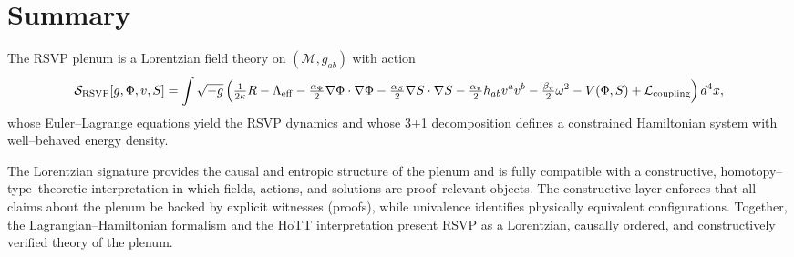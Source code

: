 \section{Summary}

The RSVP plenum is a Lorentzian field theory on $(\mathcal{M},g_{ab})$ with action
\[
\mathcal{S}_{\mathrm{RSVP}}[g,\Phi,v,S]
  = \int \sqrt{-g}\,
    \Bigl(
      \tfrac{1}{2\kappa}R
      -\Lambda_{\mathrm{eff}}
      -\tfrac{\alpha_\Phi}{2}\nabla\Phi\cdot\nabla\Phi
      -\tfrac{\alpha_S}{2}\nabla S\cdot\nabla S
      -\tfrac{\alpha_v}{2} h_{ab} v^a v^b
      -\tfrac{\beta_v}{2}\omega^2
      -V(\Phi,S)
      + \mathcal{L}_{\mathrm{coupling}}
    \Bigr)\,d^4x,
\]
whose Euler–Lagrange equations yield the RSVP dynamics and whose 3+1 decomposition defines a constrained Hamiltonian system with well–behaved energy density.

The Lorentzian signature provides the causal and entropic structure of the plenum and is fully compatible with a constructive, homotopy–type–theoretic interpretation in which fields, actions, and solutions are proof–relevant objects. The constructive layer enforces that all claims about the plenum be backed by explicit witnesses (proofs), while univalence identifies physically equivalent configurations. Together, the Lagrangian–Hamiltonian formalism and the HoTT interpretation present RSVP as a Lorentzian, causally ordered, and constructively verified theory of the plenum.

